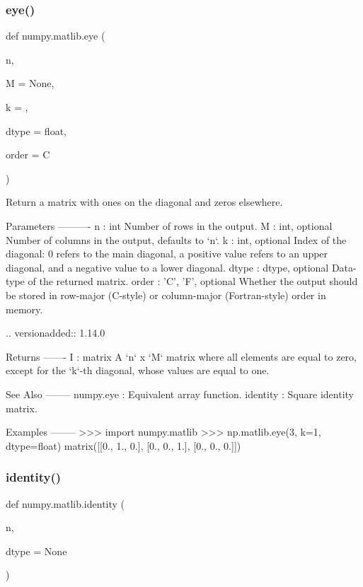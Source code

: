 \subsubsection{\texorpdfstring{eye()}{eye()}}
{\footnotesize\ttfamily def numpy.\+matlib.\+eye (\begin{DoxyParamCaption}\item[{}]{n,  }\item[{}]{M = {\ttfamily None},  }\item[{}]{k = {},  }\item[{}]{dtype = {\ttfamily float},  }\item[{}]{order = {\ttfamily \textquotesingle{}C\textquotesingle{}} }\end{DoxyParamCaption})}

\begin{DoxyVerb}Return a matrix with ones on the diagonal and zeros elsewhere.

Parameters
----------
n : int
    Number of rows in the output.
M : int, optional
    Number of columns in the output, defaults to `n`.
k : int, optional
    Index of the diagonal: 0 refers to the main diagonal,
    a positive value refers to an upper diagonal,
    and a negative value to a lower diagonal.
dtype : dtype, optional
    Data-type of the returned matrix.
order : {'C', 'F'}, optional
    Whether the output should be stored in row-major (C-style) or
    column-major (Fortran-style) order in memory.

    .. versionadded:: 1.14.0

Returns
-------
I : matrix
    A `n` x `M` matrix where all elements are equal to zero,
    except for the `k`-th diagonal, whose values are equal to one.

See Also
--------
numpy.eye : Equivalent array function.
identity : Square identity matrix.

Examples
--------
>>> import numpy.matlib
>>> np.matlib.eye(3, k=1, dtype=float)
matrix([[0.,  1.,  0.],
        [0.,  0.,  1.],
        [0.,  0.,  0.]])\end{DoxyVerb}
 \mbox{\label{namespacenumpy_1_1matlib_af468e4fd99f7c0245747fb01e067c4cb}} 
\subsubsection{\texorpdfstring{identity()}{identity()}}
{\footnotesize\ttfamily def numpy.\+matlib.\+identity (\begin{DoxyParamCaption}\item[{}]{n,  }\item[{}]{dtype = {\ttfamily None} }\end{DoxyParamCaption})}

